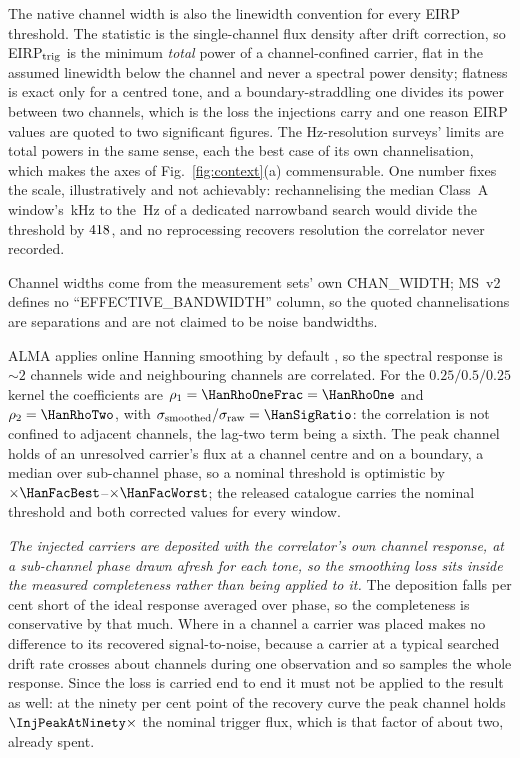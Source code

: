 The native channel width is also the linewidth convention for every EIRP
threshold. The statistic is the single-channel flux density after drift
correction, so EIRP$_{\rm trig}$ is the minimum \emph{total} power of a
channel-confined carrier, flat in the assumed linewidth below the channel and
never a spectral power density; flatness is exact only for a centred tone,
and a boundary-straddling one divides its power between two channels, which
is the loss the injections carry and one reason EIRP values are quoted to two
significant figures. The Hz-resolution
surveys' limits are total powers in the same sense, each the best case of
its own channelisation, which makes the axes of Fig.~\ref{fig:context}(a)
commensurable. One number fixes the scale, illustratively and not
achievably: rechannelising the median Class~A window's
\SqrtScaleChanKHz\,kHz to the \SETIChanHz\,Hz of a dedicated narrowband
search would divide the threshold by $418$, and no reprocessing
recovers resolution the correlator never recorded.

Channel widths come from the measurement sets' own CHAN\_WIDTH; MS~v2
defines no ``EFFECTIVE\_BANDWIDTH'' column, so the quoted channelisations are
separations and are not claimed to be noise bandwidths.

ALMA applies online Hanning smoothing by default \citep{ALMAHandbook}, so
the spectral response is ${\sim}2$ channels wide and neighbouring channels
are correlated. For the $0.25/0.5/0.25$ kernel the coefficients
are $\rho_1=\HanRhoOneFrac=\HanRhoOne$ and $\rho_2=\HanRhoTwo$, with
$\sigma_{\rm smoothed}/\sigma_{\rm raw}=\HanSigRatio$: the correlation is
not confined to adjacent channels, the lag-two term being a sixth. The peak
channel holds \HanBest{} of an unresolved carrier's flux at a channel centre
and \HanWorst{} on a boundary, a median \HanMed{} over sub-channel phase, so
a nominal threshold is optimistic by
$\times\HanFacBest$--$\times\HanFacWorst$; the released catalogue carries the
nominal threshold and both corrected values for every window.

\emph{The injected carriers are deposited with the correlator's own channel
response, at a sub-channel phase drawn afresh for each tone, so the smoothing
loss sits inside the measured completeness rather than being applied to it.}
The deposition falls \InjShortPct{} per cent short of the ideal response
averaged over phase, so the completeness is conservative by that much. Where
in a channel a carrier was placed makes no difference to its recovered
signal-to-noise, because a carrier at a typical searched drift rate crosses
about \InjDriftChan{} channels during one observation and so samples the
whole response. Since the loss is carried end to end it must not be applied
to the result as well: at the ninety per cent point of the recovery curve the
peak channel holds $\InjPeakAtNinety\times$ the nominal trigger flux, which
is that factor of about two, already spent.

